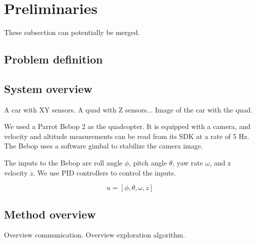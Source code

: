 
\section{Preliminaries}

These subsection can potentially be merged.

\subsection{Problem definition}


\subsection{System overview}
A car with XY sensors. A quad with Z sensors...
Image of the car with the quad.

We used a Parrot Bebop 2 as the quadcopter. It is equipped with a camera,
and velocity and altitude measurements can be read from its SDK at a rate of
5 Hz. The Bebop uses a software gimbal to stabilize the camera image.

The inputs to the Bebop are roll angle $\phi$, pitch angle $\theta$, 
yaw rate $\omega$, and z velocity $\dot{z}$. We use
PID controllers to control the inputs.

$$ u = [\phi, \theta, \omega, \dot{z}] $$

\subsection{Method overview}
Overview communication.
Overview exploration algorithm.